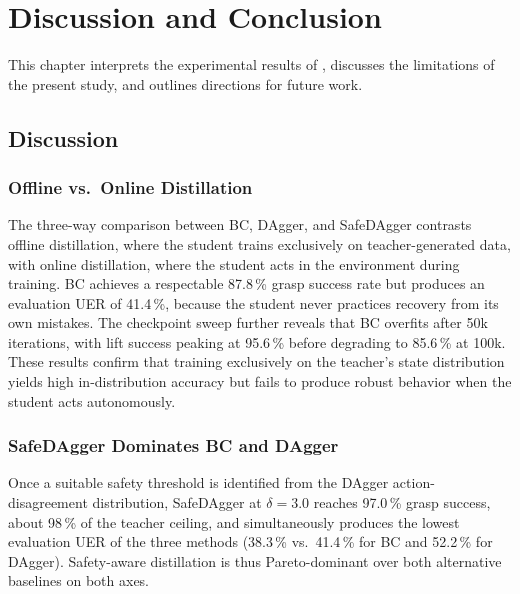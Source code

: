 \chapter{Discussion and Conclusion}%
\label{ch:conclusion}%

This chapter interprets the experimental results of , discusses the limitations of the present study, and outlines directions for future work.

\section{Discussion}%
\label{sec:discussion}%

\subsection{Offline vs.\ Online Distillation}%
\label{sec:discuss_bc}%

The three-way comparison between BC, DAgger, and SafeDAgger contrasts offline distillation, where the student trains exclusively on teacher-generated data, with online distillation, where the student acts in the environment during training.
BC achieves a respectable 87.8\,\% grasp success rate but produces an evaluation \ac{UER} of 41.4\,\%, because the student never practices recovery from its own mistakes.
The checkpoint sweep further reveals that BC overfits after 50k iterations, with lift success peaking at 95.6\,\% before degrading to 85.6\,\% at 100k.
These results confirm that training exclusively on the teacher's state distribution yields high in-distribution accuracy but fails to produce robust behavior when the student acts autonomously.

\subsection{SafeDAgger Dominates BC and DAgger}%
\label{sec:discuss_safedagger}%

Once a suitable safety threshold is identified from the DAgger action-disagreement distribution, SafeDAgger at $\delta = 3.0$ reaches 97.0\,\% grasp success, about 98\,\% of the teacher ceiling, and simultaneously produces the lowest evaluation \ac{UER} of the three methods (38.3\,\% vs.\ 41.4\,\% for BC and 52.2\,\% for DAgger).
Safety-aware distillation is thus Pareto-dominant over both alternative baselines on both axes.

